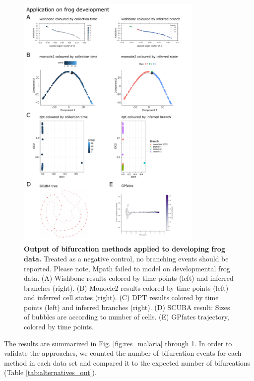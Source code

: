 \begin{figure}
    \centering
    \includegraphics[width=0.8\textwidth]{"results_frog"}
    \caption[Output of bifurcation methods applied to developing frog data]{\textbf{Output of bifurcation methods applied to developing frog data.} Treated as a negative control, no branching events should be reported. Please note, Mpath failed to model on developmental frog data. (A) Wishbone results colored by time points (left) and inferred branches (right). (B) Monocle2 results colored by time points (left) and inferred cell states (right). (C) DPT results colored by time points (left) and inferred branches (right). (D) SCUBA result: Sizes of bubbles are according to number of cells. (E) GPfates trajectory, colored by time points.}
    \label{fig:res_frog}
\end{figure}

The results are summarized in Fig. \ref{fig:res_malaria} through \ref{fig:res_frog}. In order to validate the approaches, we counted the number of bifurcation events for each method in each data set and compared it to the expected number of bifurcations (Table \ref{tab:alternatives_out}).

